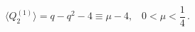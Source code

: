 \begin{equation}
\langle  Q_2^{(1)}\rangle=q-q^2-4\equiv \mu-4,\;\;\;0<\mu<\frac{1}{4}\,.
\end{equation}


